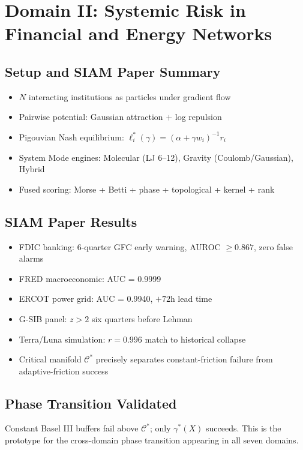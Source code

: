 \documentclass[11pt,a4paper]{article}
\newcommand{\Cman}{\mathcal{C}^*}
\begin{document}
\section{Domain II: Systemic Risk in Financial and Energy Networks}\label{sec:finance}

\subsection{Setup and SIAM Paper Summary}
\begin{itemize}[nosep]
  \item $N$ interacting institutions as particles under gradient flow
  \item Pairwise potential: Gaussian attraction $+$ log repulsion
  \item Pigouvian Nash equilibrium: $\ell_i^*(\gamma) = (\alpha + \gamma w_i)^{-1}r_i$
  \item System Mode engines: Molecular (LJ 6--12), Gravity (Coulomb/Gaussian), Hybrid
  \item Fused scoring: Morse + Betti + phase + topological + kernel + rank
\end{itemize}

\subsection{SIAM Paper Results}
\begin{itemize}[nosep]
  \item FDIC banking: 6-quarter GFC early warning, AUROC $\ge 0.867$, zero false alarms
  \item FRED macroeconomic: AUC = 0.9999
  \item ERCOT power grid: AUC = 0.9940, $+72$h lead time
  \item G-SIB panel: $z > 2$ six quarters before Lehman
  \item Terra/Luna simulation: $r = 0.996$ match to historical collapse
  \item Critical manifold $\Cman$ precisely separates constant-friction failure
        from adaptive-friction success
\end{itemize}

\subsection{Phase Transition Validated}
Constant Basel III buffers fail above $\Cman$; only $\gamma^*(X)$ succeeds.
This is the prototype for the cross-domain phase transition appearing in all
seven domains.
\end{document}
